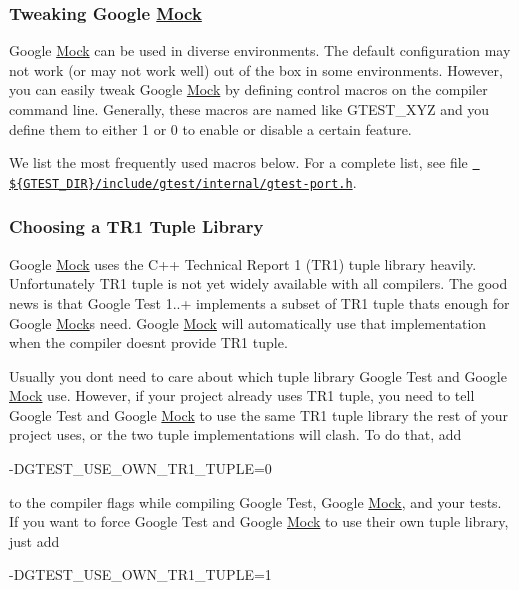 \subsubsection*{Tweaking Google \mbox{\hyperlink{class_mock}{Mock}}}

Google \mbox{\hyperlink{class_mock}{Mock}} can be used in diverse environments. The default configuration may not work (or may not work well) out of the box in some environments. However, you can easily tweak Google \mbox{\hyperlink{class_mock}{Mock}} by defining control macros on the compiler command line. Generally, these macros are named like {\ttfamily G\+T\+E\+S\+T\+\_\+\+X\+YZ} and you define them to either 1 or 0 to enable or disable a certain feature.

We list the most frequently used macros below. For a complete list, see file \href{../googletest/include/gtest/internal/gtest-port.h}\texttt{ \$\{G\+T\+E\+S\+T\+\_\+\+D\+IR\}/include/gtest/internal/gtest-\/port.h}.

\subsubsection*{Choosing a T\+R1 Tuple Library}

Google \mbox{\hyperlink{class_mock}{Mock}} uses the C++ Technical Report 1 (T\+R1) tuple library heavily. Unfortunately T\+R1 tuple is not yet widely available with all compilers. The good news is that Google Test 1..+ implements a subset of T\+R1 tuple that\textquotesingle{}s enough for Google \mbox{\hyperlink{class_mock}{Mock}}\textquotesingle{}s need. Google \mbox{\hyperlink{class_mock}{Mock}} will automatically use that implementation when the compiler doesn\textquotesingle{}t provide T\+R1 tuple.

Usually you don\textquotesingle{}t need to care about which tuple library Google Test and Google \mbox{\hyperlink{class_mock}{Mock}} use. However, if your project already uses T\+R1 tuple, you need to tell Google Test and Google \mbox{\hyperlink{class_mock}{Mock}} to use the same T\+R1 tuple library the rest of your project uses, or the two tuple implementations will clash. To do that, add \begin{DoxyVerb}-DGTEST_USE_OWN_TR1_TUPLE=0
\end{DoxyVerb}


to the compiler flags while compiling Google Test, Google \mbox{\hyperlink{class_mock}{Mock}}, and your tests. If you want to force Google Test and Google \mbox{\hyperlink{class_mock}{Mock}} to use their own tuple library, just add \begin{DoxyVerb}-DGTEST_USE_OWN_TR1_TUPLE=1
\end{DoxyVerb}



